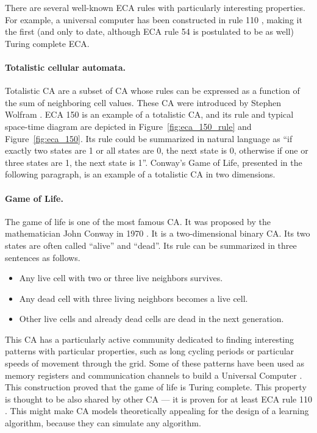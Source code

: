 There are several well-known \ac{ECA} rules with particularly interesting
properties. For example, a universal computer has been constructed in rule 110
\parencite{cookUniversalityElementaryCellular2004}, making it the first (and
only to date, although \ac{ECA} rule 54 is postulated to be as well) Turing complete \ac{ECA}.

\paragraph{Totalistic cellular automata.}
Totalistic \ac{CA} are a subset of \ac{CA} whose rules can be expressed as a
function of the sum of neighboring cell values. These \ac{CA} were introduced by
Stephen Wolfram \parencite{wolframStatisticalMechanicsCellular1983}. \ac{ECA} 150 is 
an example of a totalistic \ac{CA}, and its rule and typical space-time diagram are depicted in Figure~\ref{fig:eca_150_rule} and Figure~\ref{fig:eca_150}. Its rule could be summarized 
in natural language as 
``if exactly two states are 1 or all states are 0, the next state is 0, otherwise if 
one or three states are 1, the next state is 1''. Conway's Game of Life, presented 
in the following paragraph, is an example
of a totalistic \ac{CA} in two dimensions.

\paragraph{Game of Life.\label{sec:game-life}}
The game of life is one of the most famous \ac{CA}. It was proposed by the
mathematician John Conway in 1970 \parencite{gardnerMathematicalGames1970}. It
is a two-dimensional binary \ac{CA}. Its two states are often called ``alive''
and ``dead''. Its rule can be summarized in three sentences as follows.
\begin{itemize}
  \item Any live cell with two or three live neighbors survives.
  \item Any dead cell with three living neighbors becomes a live cell.
  \item Other live cells and already dead cells are dead in the next generation.
\end{itemize}
This \ac{CA} has a particularly active community dedicated to finding
interesting patterns with particular properties, such as long cycling periods or
particular speeds of movement through the grid. Some of these patterns have been
used as memory registers and communication channels to build a Universal
Computer \parencite{IgblanLifeUniversal}. This construction proved that the game
of life is Turing complete. This property is thought to be also shared by other
\ac{CA} --- it is proven for at least \ac{ECA} rule 110
\parencite{cookUniversalityElementaryCellular2004}. This might make \ac{CA}
models theoretically appealing for the design of a learning algorithm, because
they can simulate any algorithm.

